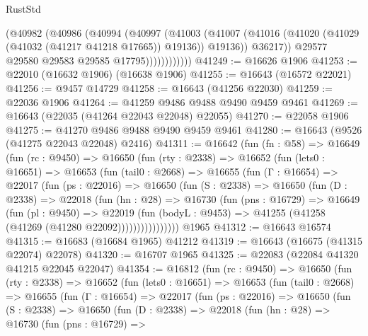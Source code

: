 \begin{lexlean}{RustStd}
\begin{coremodule}
                      (@40982
                        (@40986
                          (@40994
                            (@40997
                              (@41003
                                (@41007
                                  (@41016
                                    (@41020 (@41029 (@41032 (@41217 @41218 @17665)) @19136))
                                    @19136))
                                @36217))
                            @29577
                            @29580
                            @29583
                            @29585
                            @17795))))))))))))
@41249 := @16626 @1906
@41253 := @22010 (@16632 @1906) (@16638 @1906)
@41255 := @16643 (@16572 @22021)
@41256 := @9457 @14729
@41258 := @16643 (@41256 @22030)
@41259 := @22036 @1906
@41264 := @41259 @9486 @9488 @9490 @9459 @9461
@41269 := @16643 (@22035 (@41264 @22043 @22048) @22055)
@41270 := @22058 @1906
@41275 := @41270 @9486 @9488 @9490 @9459 @9461
@41280 := @16643 (@9526 (@41275 @22043 @22048) @2416)
@41311 := @16642
    (fun (fn : @58) =>
    @16649
      (fun (rc : @9450) =>
      @16650
        (fun (rty : @2338) =>
        @16652
          (fun (lets0 : @16651) =>
          @16653
            (fun (tail0 : @2668) =>
            @16655
              (fun (Γ : @16654) =>
              @22017
                (fun (ps : @22016) =>
                @16650
                  (fun (S : @2338) =>
                  @16650
                    (fun (D : @2338) =>
                    @22018
                      (fun (hn : @28) =>
                      @16730
                        (fun (pns : @16729) =>
                        @16649
                          (fun (pl : @9450) =>
                          @22019
                            (fun (bodyL : @9453) =>
                            @41255 (@41258 (@41269 (@41280 @22092))))))))))))))))
    @1965
@41312 := @16643 @16574
@41315 := @16683 (@16684 @1965) @41212
@41319 := @16643 (@16675 (@41315 @22074) @22078)
@41320 := @16707 @1965
@41325 := @22083 (@22084 @41320 @41215 @22045 @22047)
@41354 := @16812
    (fun (rc : @9450) =>
    @16650
      (fun (rty : @2338) =>
      @16652
        (fun (lets0 : @16651) =>
        @16653
          (fun (tail0 : @2668) =>
          @16655
            (fun (Γ : @16654) =>
            @22017
              (fun (ps : @22016) =>
              @16650
                (fun (S : @2338) =>
                @16650
                  (fun (D : @2338) =>
                  @22018
                    (fun (hn : @28) =>
                    @16730
                      (fun (pns : @16729) =>

\end{coremodule}
\end{lexlean}
